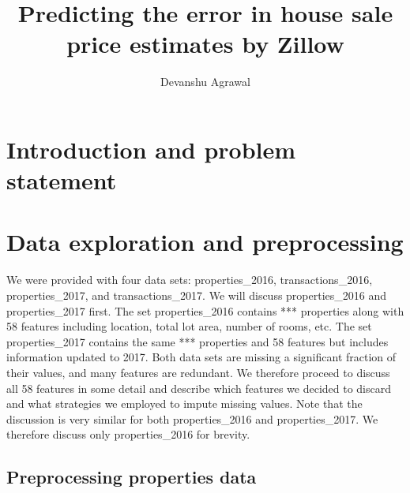 \documentclass[12pt]{article}
\title{Predicting the error in house sale price estimates by Zillow}
\author{Devanshu Agrawal}
\date{}
\begin{document}
\maketitle

\section{Introduction and problem statement}

\section{Data exploration and preprocessing}

We were provided with four data sets: properties\_2016, transactions\_2016, properties\_2017, and transactions\_2017. We will discuss properties\_2016 and properties\_2017 first. The set properties\_2016 contains *** properties along with 58 features including location, total lot area, number of rooms, etc. The set properties\_2017 contains the same *** properties and 58 features but includes information updated to 2017. Both data sets are missing a significant fraction of their values, and many features are redundant. We therefore proceed to discuss all 58 features in some detail and describe which features we decided to discard and what strategies we employed to impute missing values. Note that the discussion is very similar for both properties\_2016 and properties\_2017. We therefore discuss only properties\_2016 for brevity.

\subsection{Preprocessing properties data}
\end{document}
